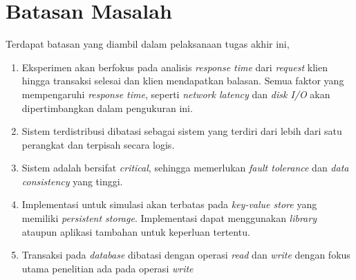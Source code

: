 \section{Batasan Masalah}

Terdapat batasan yang diambil dalam pelaksanaan tugas akhir ini,

\begin{enumerate}
    \item Eksperimen akan berfokus pada analisis \textit{response time} dari \textit{request} klien hingga transaksi selesai dan klien mendapatkan balasan. Semua faktor yang mempengaruhi \textit{response time}, seperti \textit{network latency} dan \textit{disk I/O} akan dipertimbangkan dalam pengukuran ini.
    \item Sistem terdistribusi dibatasi sebagai sistem yang terdiri dari lebih dari satu perangkat dan terpisah secara logis.
    \item Sistem adalah bersifat \textit{critical}, sehingga memerlukan \textit{fault tolerance} dan \textit{data consistency} yang tinggi.
    \item Implementasi untuk simulasi akan terbatas pada \textit{key-value store} yang memiliki \textit{persistent storage}. Implementasi dapat menggunakan \textit{library} ataupun aplikasi tambahan untuk keperluan tertentu.
    \item Transaksi pada \textit{database} dibatasi dengan operasi \textit{read} dan \textit{write} dengan fokus utama penelitian ada pada operasi \textit{write} 
\end{enumerate}

